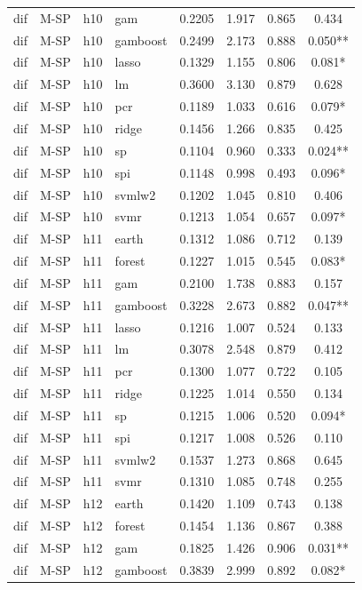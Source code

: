 \begin{ThreePartTable}
\begin{longtable}[t]{llclcccc}
dif & M-SP & h10 & gam & 0.2205 & 1.917 & 0.865 & 0.434\\
dif & M-SP & h10 & gamboost & 0.2499 & 2.173 & 0.888 & 0.050**\\
dif & M-SP & h10 & lasso & 0.1329 & 1.155 & 0.806 & 0.081*\\
dif & M-SP & h10 & lm & 0.3600 & 3.130 & 0.879 & 0.628\\
dif & M-SP & h10 & pcr & 0.1189 & 1.033 & 0.616 & 0.079*\\
dif & M-SP & h10 & ridge & 0.1456 & 1.266 & 0.835 & 0.425\\
dif & M-SP & h10 & sp & 0.1104 & 0.960 & 0.333 & 0.024**\\
dif & M-SP & h10 & spi & 0.1148 & 0.998 & 0.493 & 0.096*\\
dif & M-SP & h10 & svmlw2 & 0.1202 & 1.045 & 0.810 & 0.406\\
dif & M-SP & h10 & svmr & 0.1213 & 1.054 & 0.657 & 0.097*\\
\addlinespace
dif & M-SP & h11 & earth & 0.1312 & 1.086 & 0.712 & 0.139\\
dif & M-SP & h11 & forest & 0.1227 & 1.015 & 0.545 & 0.083*\\
dif & M-SP & h11 & gam & 0.2100 & 1.738 & 0.883 & 0.157\\
dif & M-SP & h11 & gamboost & 0.3228 & 2.673 & 0.882 & 0.047**\\
dif & M-SP & h11 & lasso & 0.1216 & 1.007 & 0.524 & 0.133\\
dif & M-SP & h11 & lm & 0.3078 & 2.548 & 0.879 & 0.412\\
dif & M-SP & h11 & pcr & 0.1300 & 1.077 & 0.722 & 0.105\\
dif & M-SP & h11 & ridge & 0.1225 & 1.014 & 0.550 & 0.134\\
dif & M-SP & h11 & sp & 0.1215 & 1.006 & 0.520 & 0.094*\\
dif & M-SP & h11 & spi & 0.1217 & 1.008 & 0.526 & 0.110\\
dif & M-SP & h11 & svmlw2 & 0.1537 & 1.273 & 0.868 & 0.645\\
dif & M-SP & h11 & svmr & 0.1310 & 1.085 & 0.748 & 0.255\\
\addlinespace
dif & M-SP & h12 & earth & 0.1420 & 1.109 & 0.743 & 0.138\\
dif & M-SP & h12 & forest & 0.1454 & 1.136 & 0.867 & 0.388\\
dif & M-SP & h12 & gam & 0.1825 & 1.426 & 0.906 & 0.031**\\
dif & M-SP & h12 & gamboost & 0.3839 & 2.999 & 0.892 & 0.082*\\

\end{longtable}
\end{ThreePartTable}
